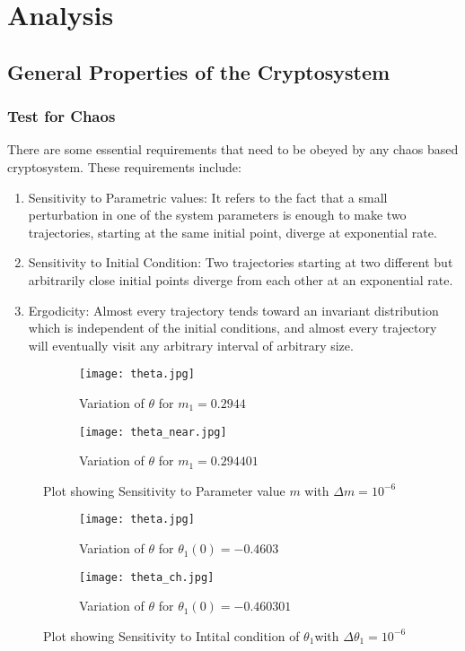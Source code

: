 \section{Analysis}
\subsection{General Properties of the Cryptosystem}
\subsubsection{Test for Chaos}
There are some essential requirements that need to be obeyed by any chaos based cryptosystem. These requirements include:
\begin{enumerate}
	\item Sensitivity to Parametric values: It refers to the fact that a small perturbation in one of the system parameters is enough to make two trajectories, starting at the same initial point, diverge at exponential rate.
	\item Sensitivity to Initial  Condition:  Two  trajectories  starting  at  two  different  but  arbitrarily  close initial points diverge from each other at an exponential rate.
	\item Ergodicity:  Almost every trajectory tends toward an invariant distribution which is independent of the initial conditions, and almost every trajectory will eventually visit any arbitrary interval of arbitrary size.
\end{enumerate}

\begin{figure}[H]
\begin{subfigure}{0.5\textwidth}
\texttt{[image: theta.jpg]}
\caption{Variation of ${\theta}$ for ${m_{1}=0.2944}$}\label{fig:theta_comp}
\end{subfigure}
\begin{subfigure}{0.5\textwidth}
\texttt{[image: theta\_near.jpg]}
\caption{Variation of ${\theta}$ for ${m_{1}=0.294401}$}\label{fig:trajectory_near_comp}
\end{subfigure}
\caption{Plot showing Sensitivity to Parameter value ${m}$ with ${\Delta m = 10^{-6}}$}\label{fig:image6}
\end{figure}

\begin{figure}[H]
\begin{subfigure}{0.5\textwidth}
\texttt{[image: theta.jpg]}
\caption{Variation of ${\theta}$ for ${\theta_{1}(0)=-0.4603}$}\label{fig:theta_comp}
\end{subfigure}
\begin{subfigure}{0.5\textwidth}
\texttt{[image: theta\_ch.jpg]}
\caption{Variation of ${\theta}$ for ${\theta_{1}(0)=-0.460301}$}\label{fig:theta_ch_comp}
\end{subfigure}
\caption{Plot showing Sensitivity to Intital condition of ${\theta_{1}}$with ${\Delta \theta_{1} = 10^{-6}}$}\label{fig:image7}
\end{figure}


